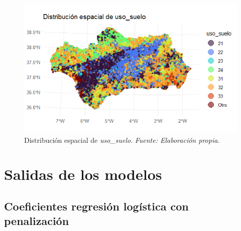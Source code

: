 \documentclass[12pt,a4paper,]{book}
\numberwithin{dummy}{section}
\theoremstyle{ocrenumbox}
\theoremstyle{blacknumex}
\theoremstyle{blacknumbox}
\theoremstyle{ocrenum}
\theoremstyle{ocrenum}
\begin{document}
\begin{figure}[H]
\centering
\includegraphics[width = \textwidth]{graficos/uso_suelo_spat.png}
\caption[Distribución espacial de \textit{uso\_suelo}]{Distribución espacial de \textit{uso\_suelo}. \it Fuente: Elaboración propia.}
\label{fig:uso_suelo_spat}
\end{figure}

\hypertarget{salidas-de-los-modelos}{%
\section{Salidas de los modelos}\label{salidas-de-los-modelos}}

\hypertarget{coeficientes-regresiuxf3n-loguxedstica-con-penalizaciuxf3n}{%
\subsection{Coeficientes regresión logística con
penalización}\label{coeficientes-regresiuxf3n-loguxedstica-con-penalizaciuxf3n}}
\end{document}
